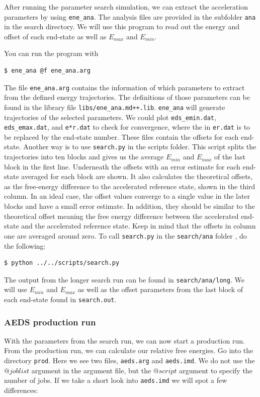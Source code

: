 After running the parameter search simulation, we can extract the acceleration parameters by using \texttt{ene\_ana}. The analysis files are provided in the subfolder \texttt{ana} in the search directory. 
We will use this program to read out the energy and offset of each end-state as well as $E_{max}$ and $E_{min}$. 

You can run the program with 
\begin{lstlisting}
$ ene_ana @f ene_ana.arg
\end{lstlisting}

The file \texttt{ene\_ana.arg} contains the information of which parameters to extract from the defined energy trajectories. The definitions of those parameters can be found in the library file \texttt{libs/ene\_ana.md++.lib}. \texttt{ene\_ana} will generate trajectories of the selected parameters. We could plot \texttt{eds\_emin.dat}, \texttt{eds\_emax.dat}, and \texttt{e*r.dat} to check for convergence, where the \* in \texttt{e\*r.dat} is to be replaced by the end-state number. These files contain the offsets for each end-state. Another way is to use \texttt{search.py} in the scripts folder. This script splits the trajectories into ten blocks and gives us the average $E_{min}$ and $E_{max}$ of the last block in the first line. Underneath the offsets with an error estimate for each end-state averaged for each block are shown. It also calculates the theoretical offsets, as the free-energy difference to the accelerated reference state, shown in the third column. In an ideal case, the offset values converge to a single value in the later blocks and have a small error estimate. In addition, they should be similar to the theoretical offset meaning the free energy difference between the accelerated end-state and the accelerated reference state. Keep in mind that the offsets in column one are averaged around zero.
To call \texttt{search.py} in the \texttt{search/ana} folder , do the following:

\begin{lstlisting}
$ python ../../scripts/search.py
\end{lstlisting}

The output from the longer search run can be found in \texttt{search/ana/long}.
We will use $E_{min}$ and $E_{max}$ as well as the offset parameters from the last block of each end-state found in \texttt{search.out}.

\subsubsection{AEDS production run}
With the parameters from the search run, we can now start a production run. From the production run, we can calculate our relative free energies. Go into the directory \texttt{prod}. Here we see two files, \texttt{aeds.arg} and \texttt{aeds.imd}. We do not use the $@joblist$ argument in the argument file, but the $@script$ argument to specify the number of jobs. If we take a short look into \texttt{aeds.imd} we will spot a few differences:


